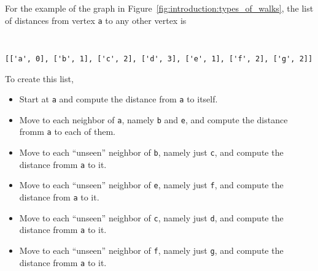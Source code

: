 For the example of the graph in
Figure~\ref{fig:introduction:types_of_walks}, the list of distances
from vertex \verb!a! to any other vertex is
%
\begin{center}
\fontsize{9pt}{9pt}
\selectfont
\tt
\begin{lstlisting}
[['a', 0], ['b', 1], ['c', 2], ['d', 3], ['e', 1], ['f', 2], ['g', 2]]
\end{lstlisting}
\end{center}
%
To create this list,
%
\begin{itemize}
\item
Start at \verb!a! and compute the distance from \verb!a! to itself.

\item
Move to each neighbor of \verb!a!, namely \verb!b! and \verb!e!, and
compute the distance fromm \verb!a! to each of them.

\item
Move to each ``unseen'' neighbor of \verb!b!, namely just \verb!c!,
and compute the distance fromm \verb!a! to it.

\item
Move to each ``unseen'' neighbor of \verb!e!, namely just \verb!f!,
and compute the distance from \verb!a! to it.

\item
Move to each ``unseen'' neighbor of \verb!c!, namely just \verb!d!,
and compute the distance fromm \verb!a! to it.

\item
Move to each ``unseen'' neighbor of \verb!f!, namely just \verb!g!,
and compute the distance fromm \verb!a! to it.
\end{itemize}

